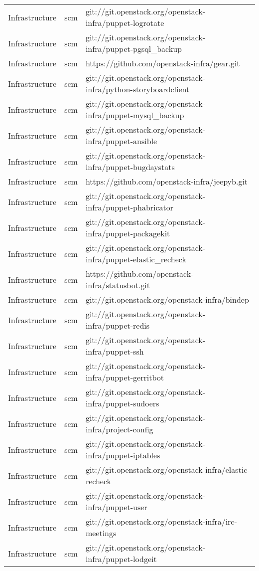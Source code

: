 \begin{center}
\begin{longtable}{|p{4cm}|p{1cm}|p{10cm}|}
Infrastructure&scm&git://git.openstack.org/openstack-infra/puppet-logrotate\\ 
Infrastructure&scm&git://git.openstack.org/openstack-infra/puppet-pgsql\_backup\\ 
Infrastructure&scm&https://github.com/openstack-infra/gear.git\\ 
Infrastructure&scm&git://git.openstack.org/openstack-infra/python-storyboardclient\\ 
Infrastructure&scm&git://git.openstack.org/openstack-infra/puppet-mysql\_backup\\ 
Infrastructure&scm&git://git.openstack.org/openstack-infra/puppet-ansible\\ 
Infrastructure&scm&git://git.openstack.org/openstack-infra/puppet-bugdaystats\\ 
Infrastructure&scm&https://github.com/openstack-infra/jeepyb.git\\ 
Infrastructure&scm&git://git.openstack.org/openstack-infra/puppet-phabricator\\ 
Infrastructure&scm&git://git.openstack.org/openstack-infra/puppet-packagekit\\ 
Infrastructure&scm&git://git.openstack.org/openstack-infra/puppet-elastic\_recheck\\ 
Infrastructure&scm&https://github.com/openstack-infra/statusbot.git\\ 
Infrastructure&scm&git://git.openstack.org/openstack-infra/bindep\\ 
Infrastructure&scm&git://git.openstack.org/openstack-infra/puppet-redis\\ 
Infrastructure&scm&git://git.openstack.org/openstack-infra/puppet-ssh\\ 
Infrastructure&scm&git://git.openstack.org/openstack-infra/puppet-gerritbot\\ 
Infrastructure&scm&git://git.openstack.org/openstack-infra/puppet-sudoers\\ 
Infrastructure&scm&git://git.openstack.org/openstack-infra/project-config\\ 
Infrastructure&scm&git://git.openstack.org/openstack-infra/puppet-iptables\\ 
Infrastructure&scm&git://git.openstack.org/openstack-infra/elastic-recheck\\ 
Infrastructure&scm&git://git.openstack.org/openstack-infra/puppet-user\\ 
Infrastructure&scm&git://git.openstack.org/openstack-infra/irc-meetings\\ 
Infrastructure&scm&git://git.openstack.org/openstack-infra/puppet-lodgeit\\ 

\end{longtable}
\end{center}
